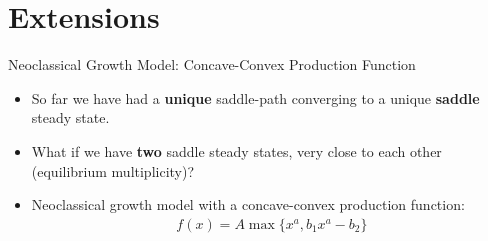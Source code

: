\documentclass[aspectratio=169,10pt]{beamer}
\newcommand{\emphcolor}[1]{\textbf{\textcolor{emphcolorval}{#1}}}
\begin{document}
\section{Extensions}

\begin{frame}{Neoclassical Growth Model: Concave-Convex Production Function}
	\begin{itemize}
		\item So far we have had a \emphcolor{unique} saddle-path converging to a unique \emphcolor{saddle} steady state.
		\vspace{0.1in}
		\item What if we have \emphcolor{two} saddle steady states, very close to each other (equilibrium multiplicity)?
		\vspace{0.1in}
		\item Neoclassical growth model with a concave-convex production function:
		\begin{align*}
			f(x) = A \max\{x^a, b_1x^a - b_2\}
		\end{align*}
	\end{itemize}
\end{frame}
\end{document}
